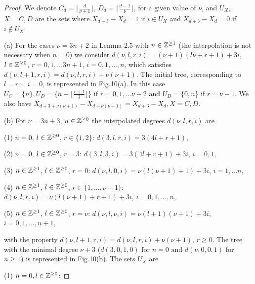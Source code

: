 \documentclass[10pt,a4paper]{amsart}
\begin{document}
           \begin{proof}     
               We denote  $C_{d}= \Big \lfloor \frac{d}{\nu+1} \Big \rfloor$, $D_{d}=\Big \lfloor \frac{d-1}{\nu} \Big \rfloor$, for a given value of $\nu$, and 
$U_{X}$, $X=C, D$ are the sets where $X_{d+3}- X_{d}=1$ if $i \in U_{X}$  and  $X_{d+3}- X_{d}=0$ if $i \notin U_{X}$. 

(a) For the cases  $\nu= 3n+2$ in Lemma 2.5 with $n \in {\Bbb{Z}}^{\geq 1}$ (the interpolation is not necessary when $n=0$) we consider $d(\nu, l, r, i)=(\nu+1)(l\nu + r+1) + 3i$, $l \in {\Bbb{Z}}^{\geq 0}$, $r=0,1,\dots 3n+1$, $i=0,1,\dots, n$, which satisfies $d(\nu, l+1, r, i)= d(\nu, l, r, i)+ \nu(\nu+1)$. The initial tree, corresponding to $l=r=i=0$, is represented in Fig.10(a). In this case $U_{C}=\{n\}, U_{D}=\{n-\Big \lfloor\frac{r+1}{3} \Big \rfloor \}$ if $r=0, 1, \dots \nu -2$ and $U_{D}=\{0, n\}$ if $r = \nu -1$. We also have $X_{d+3+\nu(\nu+1)}- X_{d+\nu(\nu+1)} = X_{d+3}- X_{d}, X=C, D$. 

 \bigskip\par
    
        (b)  For $\nu= 3n+3$, $n \in {\Bbb{Z}}^{\geq 0}$  the interpolated degrees $d(\nu, l, r, i)$ are
      \bigskip\par             
                 (1)  $n=0$, $l \in {\Bbb{Z}}^{\geq 0}$, $r \in \{1,2\}$: $d(3, l, r, i)= 3(4l+r+1)$,
                 
                 (2)  $n=0$, $l \in {\Bbb{Z}}^{\geq 0}$, $r=3$: $d(3, l, 3, i)= 3(4l+r+1)+3i$,  $i=0,1$, 
                 
                  (3) $n \in {\Bbb{Z}}^{\geq 1}$, $l \in {\Bbb{Z}}^{\geq 0}$, $r=0$: $d(\nu, l, 0, i)=\nu(l(\nu +1)+1)+ 3i$, $i=1,\dots n$,
                  
                   (4) $n \in {\Bbb{Z}}^{\geq 1}$, $l \in {\Bbb{Z}}^{\geq 0}$, $r \in \{1, \dots , \nu-1\}$: $d(\nu, l, r, i)=\nu(l(\nu +1)+r+1)+ 3i$, $i=0,1,\dots, n$, 
                   
                    (5) $n \in {\Bbb{Z}}^{\geq 1}$, $l \in {\Bbb{Z}}^{\geq 0}$, $r= \nu$: $d(\nu, l, \nu, i)=\nu(l+1)(\nu +1)+ 3i$, $i=0,1,\dots, n+1$, 
                   
                   
       \bigskip\par            
  \noindent               
 with the property $d(\nu, l+1, r, i)=d(\nu, l, r, i)+ \nu(\nu+1)$, $r \geq 0$.  The tree with the minimal degree $\nu+3$ ($d(3, 0, 1, 0)$ for $n=0$ and $d(\nu, 0, 0, 1)$ for  $n \geq 1$) is represented in Fig.10(b). The sets $U_{X}$ are 
      \bigskip\par 
    (1)  $n=0, l \in {\Bbb{Z}}^{\geq 0}$: 
    

\end{proof}
\end{document}
